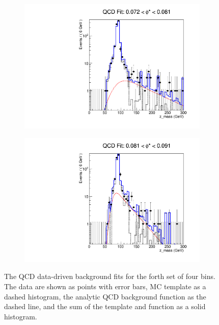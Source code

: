 \begin{figure}[!htbp]
\begin{subfigure}[b]{0.5\textwidth}
        \includegraphics[width=\linewidth]{figures/qcd_fits/qcd_fit_plot_for_15.pdf}
        \caption{}
        \label{fig:qcd_fit_15}
    \end{subfigure}%
    \begin{subfigure}[b]{0.5\textwidth}
        \includegraphics[width=\linewidth]{figures/qcd_fits/qcd_fit_plot_for_16.pdf}
        \caption{}
        \label{fig:qcd_fit_16}
    \end{subfigure}
    \caption{
       The QCD data-driven background fits for the forth set of four \phistar
       bins. The data are shown as points with error bars, MC template as a
       dashed histogram, the analytic QCD background function as the dashed
       line, and the sum of the template and function as a solid histogram.
    }
    \label{fig:qcd_many_4}
\end{figure}

